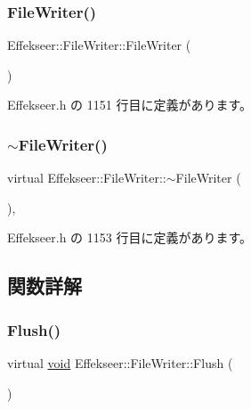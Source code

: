 \subsubsection{\texorpdfstring{File\+Writer()}{FileWriter()}}
{\footnotesize\ttfamily Effekseer\+::\+File\+Writer\+::\+File\+Writer (\begin{DoxyParamCaption}{ }\end{DoxyParamCaption})\hspace{0.3cm}{\ttfamily [inline]}}



 Effekseer.\+h の 1151 行目に定義があります。

\mbox{\label{class_effekseer_1_1_file_writer_aa4959a2a84ec4754b615d6b665d71988}} 
\subsubsection{\texorpdfstring{$\sim$\+File\+Writer()}{~FileWriter()}}
{\footnotesize\ttfamily virtual Effekseer\+::\+File\+Writer\+::$\sim$\+File\+Writer (\begin{DoxyParamCaption}{ }\end{DoxyParamCaption})\hspace{0.3cm}{\ttfamily [inline]}, {\ttfamily [virtual]}}



 Effekseer.\+h の 1153 行目に定義があります。



\subsection{関数詳解}
\mbox{\label{class_effekseer_1_1_file_writer_a319bba7ef4e98e98a5248accbee98df1}} 
\subsubsection{\texorpdfstring{Flush()}{Flush()}}
{\footnotesize\ttfamily virtual \mbox{\hyperlink{namespace_effekseer_ab34c4088e512200cf4c2716f168deb56}{void}} Effekseer\+::\+File\+Writer\+::\+Flush (\begin{DoxyParamCaption}{ }\end{DoxyParamCaption})\hspace{0.3cm}{\ttfamily [pure virtual]}}




